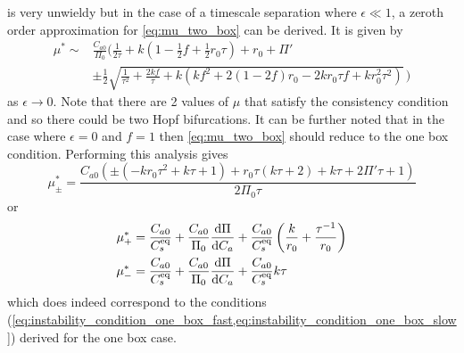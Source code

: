  is very unwieldy but in the case of a timescale separation where $\epsilon \ll 1$, a zeroth order approximation for \cref{eq:mu_two_box} can be derived. It is given by
\begin{equation}
  \label{eq:mu_two_box_zero_eps}
  \begin{split}
  \mu^* \sim &\frac{C_{a0}}{\Pi_0}\Biggl(
    \frac{1}{2\tau} + k(1 - \frac{1}{2}f + \frac{1}{2}r_0 \tau) + r_0 + \Pi'\\
    &\pm\frac{1}{2}\sqrt{\frac{1}{\tau^2} + \frac{2kf}{\tau} + k(kf^2 + 2 (1 - 2f)r_0  - 2 k r_0\tau f  + k r_0^2 \tau^2)}\,\Biggr)
\end{split}
\end{equation}
as $\epsilon \rightarrow 0$.
Note that there are 2 values of $\mu$ that satisfy the consistency condition and so there could be two Hopf bifurcations. It can be further noted that
in the case where $\epsilon = 0$ and $f=1$ then \cref{eq:mu_two_box} should reduce to the one box condition.
Performing this analysis gives
\begin{equation}
  \label{eq:mu_zero_one}
  \mu^*_{\pm} = \frac{C_{a0} \left(\pm\left(-k r_0 \tau ^2+k \tau +1\right)+r_0 \tau  (k \tau +2)+k \tau +2 \Pi' \tau +1\right)}{2 \Pi_0 \tau}
\end{equation}
or
\begin{align}
  \label{eq:mu_zero_one_cases}
  \mu_+^* &= \frac{C_{a0}}{C_s^{\mathrm{eq}}} + \frac{C_{a0}}{\Pi_0}\dv{\Pi}{C_a} + \frac{C_{a0}}{C_s^{\mathrm{eq}}} \left(\frac{k}{r_0} + \frac{\tau^{-1}}{r_0}\right) \\
  \mu_-^* &= \frac{C_{a0}}{C_s^{\mathrm{eq}}} + \frac{C_{a0}}{\Pi_0}\dv{\Pi}{C_a} + \frac{C_{a0}}{C_s^{\mathrm{eq}}}k\tau 
\end{align}
which does indeed correspond to the conditions (\cref{eq:instability_condition_one_box_fast,eq:instability_condition_one_box_slow}) derived for the one box case.

